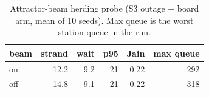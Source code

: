 \begin{table}
\centering
\caption{Attractor-beam herding probe (S3 outage + board arm, mean of
10 seeds).  Max queue is the worst station queue in the run.}
\label{tab:e6}
\begin{tabular}{@{}lrrrrr@{}}
\toprule
beam & strand & wait & p95 & Jain & max queue \\
\midrule
on  & 12.2 & 9.2 & 21 & 0.22 & 292 \\
off & 14.8 & 9.1 & 21 & 0.22 & 318 \\
\bottomrule
\end{tabular}
\end{table}
